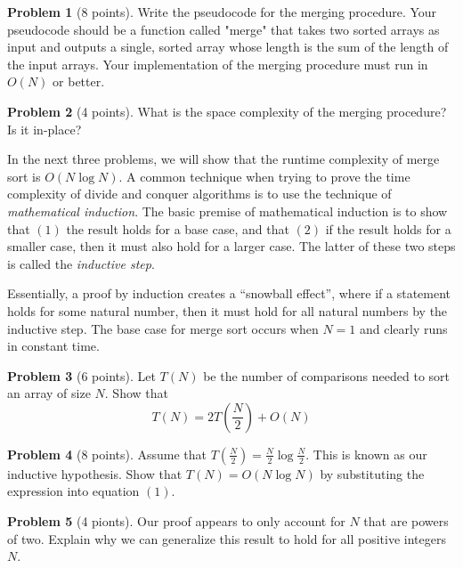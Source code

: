 \documentclass{exam}
\theoremstyle{definition}
\newtheorem{problem}{Problem}[section]
\theoremstyle{definition}
\begin{document}
\begin{problem}[8 points]
    Write the pseudocode for the merging procedure. Your pseudocode should be a function called "merge" that takes two sorted arrays as input and outputs a single, sorted array whose length is the sum of the length of the input arrays. Your implementation of the merging procedure must run in $O(N)$ or better. 
\end{problem}

\begin{problem}[4 points]
    What is the space complexity of the merging procedure? Is it in-place? 
\end{problem}

In the next three problems, we will show that the runtime complexity of merge sort is $O(N \log N)$. A common technique when trying to prove the time complexity of divide and conquer algorithms is to use the technique of  \textit{mathematical induction}. The basic premise of mathematical induction is to show that $(1)$ the result holds for a base case, and that $(2)$ if the result holds for a smaller case, then it must also hold for a larger case. The latter of these two steps is called the \textit{inductive step}.

Essentially, a proof by induction creates a ``snowball effect'', where if a statement holds for some natural number, then it must hold for all natural numbers by the inductive step. The base case for merge sort occurs when $N = 1$ and clearly runs in constant time.

\begin{problem}[6 points]
    Let $ T(N) $ be the number of comparisons needed to sort an array of size $ N $. Show that 
    \begin{equation}
         T(N) = 2 T\left(\frac{N}{2}\right) + O(N)
    \end{equation}
\end{problem}

\begin{problem}[8 points]
    Assume that $ T(\frac{N}{2}) = \frac{N}{2} \log \frac{N}{2} $. This is known as our inductive hypothesis. Show that $ T(N) = O(N \log N) $ by substituting the expression into equation $(1)$. 
\end{problem}

\begin{problem}[4 pionts]
    Our proof appears to only account for $N$ that are powers of two. Explain why we can generalize this result to hold for all positive integers $N$. 
\end{problem}
\end{document}
